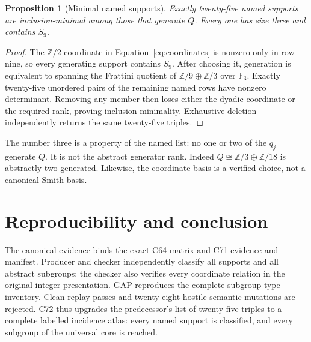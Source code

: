 \documentclass[10pt]{article}
\newtheorem{proposition}{Proposition}
\newcommand{\Z}{\mathbb Z}
\begin{document}
\begin{proposition}[Minimal named supports]
Exactly twenty-five named supports are inclusion-minimal among those that
generate $Q$.  Every one has size three and contains $S_9$.
\end{proposition}

\begin{proof}
The $\Z/2$ coordinate in Equation~\eqref{eq:coordinates} is nonzero only in
row nine, so every generating support contains $S_9$.  After choosing it,
generation is equivalent to spanning the Frattini quotient of
$\Z/9\oplus\Z/3$ over $\mathbb F_3$.  Exactly twenty-five unordered pairs
of the remaining named rows have nonzero determinant.  Removing any member
then loses either the dyadic coordinate or the required rank, proving
inclusion-minimality.  Exhaustive deletion independently returns the same
twenty-five triples.
\end{proof}

The number three is a property of the named list: no one or two of the
$q_j$ generate $Q$.  It is not the abstract generator rank.  Indeed
$Q\cong\Z/3\oplus\Z/18$ is abstractly two-generated.  Likewise, the
coordinate basis is a verified choice, not a canonical Smith basis.

\section{Reproducibility and conclusion}
The canonical evidence binds the exact C64 matrix and C71 evidence and
manifest.  Producer and checker independently classify all supports and all
abstract subgroups; the checker also verifies every coordinate relation in
the original integer presentation.  GAP reproduces the complete subgroup
type inventory.  Clean replay passes and twenty-eight hostile semantic
mutations are rejected.  C72 thus upgrades the predecessor's list of
twenty-five triples to a complete labelled incidence atlas: every named
support is classified, and every subgroup of the universal core is reached.
\end{document}
